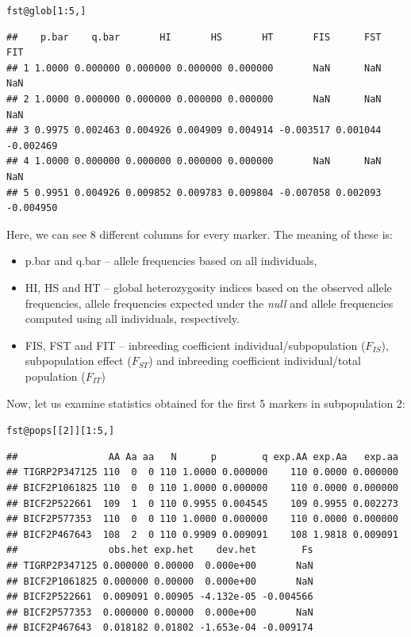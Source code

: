 \documentclass[12pt,a4paper,oneside]{article}\usepackage[]{graphicx}\usepackage[]{color}
\makeatletter
\newcommand{\hlnum}[1]{\textcolor[rgb]{0.686,0.059,0.569}{#1}}%
\newcommand{\hlopt}[1]{\textcolor[rgb]{0,0,0}{#1}}%
\newcommand{\hlstd}[1]{\textcolor[rgb]{0.345,0.345,0.345}{#1}}%
\newcommand{\hlkwc}[1]{\textcolor[rgb]{0.333,0.667,0.333}{#1}}%
\newenvironment{kframe}{%
 \def\at@end@of@kframe{}%
 \ifinner\ifhmode%
  \def\at@end@of@kframe{\end{minipage}}%
  \begin{minipage}{\columnwidth}%
 \fi\fi%
 \def\FrameCommand##1{\hskip\@totalleftmargin \hskip-\fboxsep
 \colorbox{shadecolor}{##1}\hskip-\fboxsep
     \hskip-\linewidth \hskip-\@totalleftmargin \hskip\columnwidth}%
 \MakeFramed {\advance\hsize-\width
   \@totalleftmargin\z@ \linewidth\hsize
   \@setminipage}}%
 {\par\unskip\endMakeFramed%
 \at@end@of@kframe}
\newenvironment{knitrout}{}{} %
\makeatother
\begin{document}
\begin{knitrout}\footnotesize
{}\color{fgcolor}\begin{kframe}
\begin{alltt}
\hlstd{fst}\hlopt{@}\hlkwc{glob}\hlstd{[}\hlnum{1}\hlopt{:}\hlnum{5}\hlstd{, ]}
\end{alltt}
\begin{verbatim}
##    p.bar    q.bar       HI       HS       HT       FIS      FST       FIT
## 1 1.0000 0.000000 0.000000 0.000000 0.000000       NaN      NaN       NaN
## 2 1.0000 0.000000 0.000000 0.000000 0.000000       NaN      NaN       NaN
## 3 0.9975 0.002463 0.004926 0.004909 0.004914 -0.003517 0.001044 -0.002469
## 4 1.0000 0.000000 0.000000 0.000000 0.000000       NaN      NaN       NaN
## 5 0.9951 0.004926 0.009852 0.009783 0.009804 -0.007058 0.002093 -0.004950
\end{verbatim}
\end{kframe}
\end{knitrout}
Here, we can see 8 different columns for every marker. The meaning of these is:
\begin{itemize}
  \item{p.bar and q.bar -- allele frequencies based on all individuals},
  \item{HI, HS and HT -- global heterozygosity indices based on the observed allele frequencies, allele frequencies expected under the \textit{null} and allele frequencies computed using all individuals, respectively.}
  \item{FIS, FST and FIT -- inbreeding coefficient individual/subpopulation ($F_{IS}$), subpopulation effect ($F_{ST}$) and inbreeding coefficient individual/total population ($F_{IT}$)}
\end{itemize}
Now, let us examine statistics obtained for the first 5 markers in subpopulation 2:
\begin{knitrout}\footnotesize
{}\color{fgcolor}\begin{kframe}
\begin{alltt}
\hlstd{fst}\hlopt{@}\hlkwc{pops}\hlstd{[[}\hlnum{2}\hlstd{]][}\hlnum{1}\hlopt{:}\hlnum{5}\hlstd{, ]}
\end{alltt}
\begin{verbatim}
##                AA Aa aa   N      p        q exp.AA exp.Aa   exp.aa
## TIGRP2P347125 110  0  0 110 1.0000 0.000000    110 0.0000 0.000000
## BICF2P1061825 110  0  0 110 1.0000 0.000000    110 0.0000 0.000000
## BICF2P522661  109  1  0 110 0.9955 0.004545    109 0.9955 0.002273
## BICF2P577353  110  0  0 110 1.0000 0.000000    110 0.0000 0.000000
## BICF2P467643  108  2  0 110 0.9909 0.009091    108 1.9818 0.009091
##                obs.het exp.het    dev.het        Fs
## TIGRP2P347125 0.000000 0.00000  0.000e+00       NaN
## BICF2P1061825 0.000000 0.00000  0.000e+00       NaN
## BICF2P522661  0.009091 0.00905 -4.132e-05 -0.004566
## BICF2P577353  0.000000 0.00000  0.000e+00       NaN
## BICF2P467643  0.018182 0.01802 -1.653e-04 -0.009174
\end{verbatim}
\end{kframe}
\end{knitrout}
\end{document}

